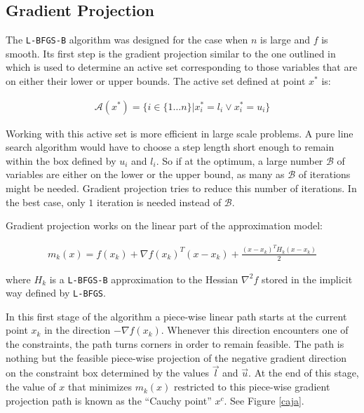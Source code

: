 \subsection{Gradient Projection} \label{gp}
The \texttt{L-BFGS-B} algorithm was designed for the case when $n$ is large and $f$ is smooth. Its first step is the gradient projection similar to the one outlined in \citep{gradproj1, gradproj2} which is used to determine an active set corresponding to those variables that are on either their lower or upper bounds. The active set defined at point $x^*$ is:

\begin{equation}
  \begin{aligned}
    \mathcal{A}(x^*) = \{ i \in \{1 \ldots n\} |  x^*_i = l_i \vee  x^*_i = u_i\}
  \end{aligned}
\end{equation}

Working with this active set is more efficient in large scale problems. A pure line search algorithm would have to choose a step length short enough to remain within the box defined by $u_i$ and $l_i$. So if at the optimum, a large number $\mathcal{B}$ of variables are either on the lower or the upper bound, as many as $\mathcal{B}$ of iterations might be needed. Gradient projection tries to reduce this number of iterations. In the best case, only $1$ iteration is needed instead of $\mathcal{B}$.

Gradient projection works on the linear part of the approximation model:

\begin{equation} \label{themodel}
  \begin{aligned}
    m_k(x) = f(x_k) + \nabla f(x_k)^T ( x - x_k) + \frac{(x - x_k)^T H_k (x - x_k) }{2}
  \end{aligned}
\end{equation}

where $H_k$ is a \texttt{L-BFGS-B} approximation to the Hessian $\nabla^2 f$ stored in the implicit way defined by \texttt{L-BFGS}.

In this first stage of the algorithm a piece-wise linear path starts at the current point $x_k$ in the direction $-\nabla f(x_k)$. Whenever this direction encounters one of the constraints, the path turns corners in order to remain feasible. The path is nothing but the feasible piece-wise projection of the negative gradient direction on the constraint box determined by the values $\overrightarrow{l}$ and $\overrightarrow{u}$. At the end of this stage, the value of $x$ that minimizes $m_k(x)$ restricted to this piece-wise gradient projection path is known as the ``Cauchy point'' $x^c$. See Figure \ref{caja}.

